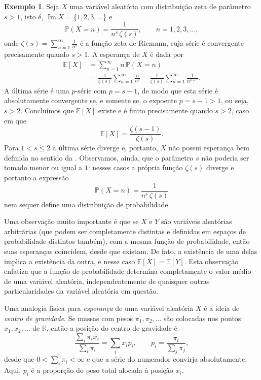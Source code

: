 \documentclass[12pt,portuguese]{article}
\let\leq\leqslant
\theoremstyle{definition}
\newtheorem{example}[example]{Exemplo}
\begin{document}
\begin{example}\label{ex-esperanca-zeta}
Seja $X$ uma variável aleatória com distribuição zeta de parâmetro $s>1$,
isto é, $\operatorname{Im} X = \{1, 2, 3, \ldots\}$ e
\[
\mathbb{P}(X = n) = \frac{1}{n^{s}\,\zeta(s)}, \qquad n = 1, 2, 3, \ldots,
\]
onde $\zeta(s) = \sum_{n=1}^{\infty} \frac{1}{n^{s}}$ é a função zeta de
Riemann, cuja série é convergente precisamente quando $s > 1$. A esperança
de $X$ é dada por
\begin{align*}
\mathbb{E}[X]
&=
\sum_{n=1}^{\infty} n\, \mathbb{P}(X = n)
\\[0.3cm]
&=
\frac{1}{\zeta(s)} \sum_{n=1}^{\infty} \frac{n}{n^{s}}
=
\frac{1}{\zeta(s)} \sum_{n=1}^{\infty} \frac{1}{n^{s-1}}.
\end{align*}
A última série é uma $p$-série com $p=s-1$, de modo que
esta série é absolutamente convergente se, e somente se, o expoente $p=s-1 > 1$, ou seja, $s > 2$. Concluímos que
$\mathbb{E}[X]$ existe e é finito precisamente quando $s > 2$, caso em que
\[
\mathbb{E}[X] = \frac{\zeta(s-1)}{\zeta(s)}.
\]
Para $1 < s \leq 2$ a última série diverge e, portanto, $X$ não possui
esperança bem definida no sentido da . Observamos,
ainda, que o parâmetro $s$ não poderia ser tomado menor ou igual a $1$:
nesses casos a própria função $\zeta(s)$ diverge e portanto a expressão
$$\mathbb{P}(X = n) = \frac{1}{n^{s}\,\zeta(s)}$$ 
nem sequer define uma distribuição de probabilidade.
\end{example}

\bigskip

Uma observação muito importante é que se $X$ e $Y$ são variáveis aleatórias
arbitrárias (que podem ser completamente distintas e definidas em espaços de probabilidade distintos também),
com a mesma função de probabilidade, então suas esperanças coincidem, desde que existam. De fato,
a existência de uma delas implica a existência da outra, e nesse caso
$\mathbb{E}[X]=\mathbb{E}[Y]$. Esta observação enfatiza que a função de probabilidade
determina completamente o valor médio de uma variável aleatória, independentemente de quaisquer outras
particularidades da variável aleatória em questão.

\bigskip 

Uma analogia física para \emph{esperança} de uma variável aleatória $X$ é a ideia de
\emph{centro de gravidade}. Se massas com pesos \(\pi_1, \pi_2, \ldots\) são colocadas nos
pontos \(x_1, x_2, \ldots\) de \(\mathbb{R}\), então a posição do centro de
gravidade é
\[
\frac{\sum_i \pi_i x_i}{\sum_i \pi_i} = \sum_i x_i p_i,
\qquad
p_i = \frac{\pi_i}{\sum_j \pi_j},
\]
desde que \(0<\sum_i\pi_i<\infty\) e que a série do numerador
convirja absolutamente. Aqui, \(p_i\) é a proporção do peso total alocada à
posição \(x_i\).
\end{document}
